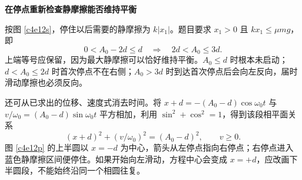 \begin{solution}
\par\medskip{}\noindent\textbf{在停点重新检查静摩擦能否维持平衡}\par\nobreak
按图 \ref{c4e12s}，停住以后需要的静摩擦为 $k|x_1|$。题目要求 $x_1>0$ 且 $kx_1\le\mu mg$，即
\[
 0<A_0-2d\le d
 \quad\Rightarrow\quad
 \boxed{2d<A_0\le3d}.
\]
上端等号应保留，因为最大静摩擦可以恰好维持平衡。$A_0\le d$ 时根本未启动；$d<A_0\le2d$ 时首次停点不在右侧；$A_0>3d$ 时到达首次停点后会向左反向，届时滑动摩擦也必须反向。

还可从已求出的位移、速度式消去时间。将 $x+d=-(A_0-d)\cos\omega_0t$ 与 $v/\omega_0=(A_0-d)\sin\omega_0t$ 平方相加，利用 $\sin^2+\cos^2=1$，得到该段相平面关系
\[
 (x+d)^2+(v/\omega_0)^2=(A_0-d)^2,\qquad v\ge0.
\]
图 \ref{c4e12p} 的上半圆以 $x=-d$ 为中心，箭头从左停点指向右停点；右停点进入蓝色静摩擦区间便停住。如果开始向左滑动，方程中心会变成 $x=+d$，应改画下半圆段，不能始终沿同一个相圆往复。
\end{solution}

